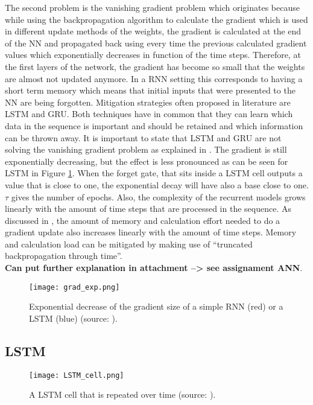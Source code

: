 The second problem is the vanishing gradient problem which originates because while using the backpropagation algorithm to calculate the gradient which is used in different update methods of the weights, the gradient is calculated at the end of the NN and propagated back using every time the previous calculated gradient values which exponentially decreases in function of the time steps. Therefore, at the first layers of the network, the gradient has become so small that the weights are almost not updated anymore. In a RNN setting this corresponds to having a short term memory which means that initial inputs that were presented to the NN are being forgotten. Mitigation strategies often proposed in literature are LSTM and GRU. Both techniques have in common that they can learn which data in the sequence is important and should be retained and which information can be thrown away. It is important to state that LSTM and GRU are not solving the vanishing gradient problem as explained in \cite{Teuwen2019}. The gradient is still exponentially decreasing, but the effect is less pronounced as can be seen for LSTM in Figure \ref{fig:grad_exp}. When the forget gate, that sits inside a LSTM cell outputs a value that is close to one, the exponential decay will have also a base close to one. $ \tau $ gives the number of epochs. Also, the complexity of the recurrent models grows linearly with the amount of time steps that are processed in the sequence. As discussed in \cite{Teuwen2019}, the amount of memory and calculation effort needed to do a gradient update also increases linearly with the amount of time steps. Memory and calculation load can be mitigated by making use of ``truncated backpropagation through time''. \\ \textbf{Can put further explanation in attachment --> see assignament ANN}.

\begin{figure}[h!]
	\centering
	\texttt{[image: grad\_exp.png]}
	\caption{Exponential decrease of the gradient size of a simple RNN (red) or a LSTM (blue) (source: \cite{Teuwen2019}).}
	\label{fig:grad_exp}
\end{figure}


\subsection{LSTM}\label{s:LSTM}

\begin{figure}[ht]
	\centering
	\texttt{[image: LSTM\_cell.png]}
	\caption{A LSTM cell that is repeated over time (source: \cite{Olah}).}
	\label{fig:LSTM_cell}
\end{figure}

